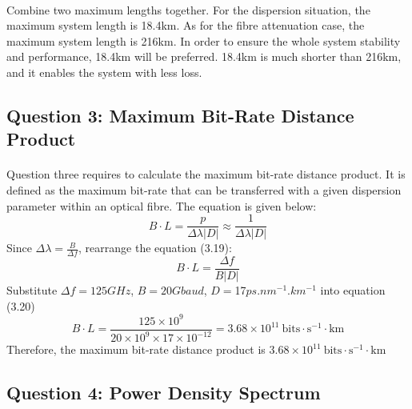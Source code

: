 \documentclass[12pt]{article}
\begin{document}
    \paragraph{}
    Combine two maximum lengths together. For the dispersion situation, the maximum system length is 18.4km. As for the fibre attenuation case, the maximum system length is 216km. In order to ensure the whole system stability and performance, 18.4km will be preferred. 18.4km is much shorter than 216km, and it enables the system with less loss. 
    
    
    
    
    
    \subsection{Question 3: Maximum Bit-Rate Distance Product}
    \paragraph{}
    Question three requires to calculate the maximum bit-rate distance product. It is defined as the maximum bit-rate that can be transferred with a given dispersion parameter within an optical fibre. The equation is given below:
    \begin{equation}
        B \cdot L = \frac{p}{\Delta \lambda |D|} \approx \frac{1}{\Delta \lambda |D|}
    \end{equation}
    Since $\Delta \lambda=\frac{B}{\Delta f}$, rearrange the equation (3.19):
    \begin{equation}
        B \cdot L = \frac{\Delta f}{B |D|}
    \end{equation}
    Substitute $\Delta f = 125GHz$, $B=20Gbaud$, $D=$17$ps.nm^{-1}.km^{-1}$ into equation (3.20)
    \begin{equation}
        B \cdot L = \frac{125 \times 10^{9}}{20 \times 10^9 \times 17 \times 10^{-12}} = 3.68 \times 10^{11} \ \mbox{bits} \cdot \mbox{s}^{-1} \cdot \mbox{km}
    \end{equation}
    Therefore, the maximum bit-rate distance product is $3.68 \times 10^{11} \ \mbox{bits} \cdot \mbox{s}^{-1} \cdot \mbox{km}$
    
    
    
    
    \subsection{Question 4: Power Density Spectrum}
\end{document}
